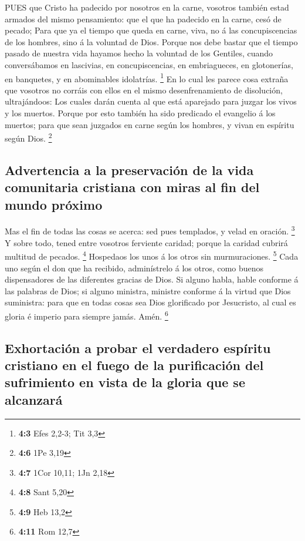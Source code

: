  PUES que Cristo ha padecido por nosotros en la carne,
vosotros también estad armados del mismo pensamiento: que el que ha
padecido en la carne, cesó de pecado;  Para que ya el tiempo
que queda en carne, viva, no á las concupiscencias de los hombres, sino
á la voluntad de Dios.  Porque nos debe bastar que el tiempo
pasado de nuestra vida hayamos hecho la voluntad de los Gentiles, cuando
conversábamos en lascivias, en concupiscencias, en embriagueces, en
glotonerías, en banquetes, y en abominables idolatrías. \footnote{\textbf{4:3}
  Efes 2,2-3; Tit 3,3}  En lo cual les parece cosa extraña
que vosotros no corráis con ellos en el mismo desenfrenamiento de
disolución, ultrajándoos:  Los cuales darán cuenta al que
está aparejado para juzgar los vivos y los muertos.  Porque
por esto también ha sido predicado el evangelio á los muertos; para que
sean juzgados en carne según los hombres, y vivan en espíritu según
Dios. \footnote{\textbf{4:6} 1Pe 3,19}

\hypertarget{advertencia-a-la-preservaciuxf3n-de-la-vida-comunitaria-cristiana-con-miras-al-fin-del-mundo-pruxf3ximo}{%
\subsection{Advertencia a la preservación de la vida comunitaria
cristiana con miras al fin del mundo
próximo}\label{advertencia-a-la-preservaciuxf3n-de-la-vida-comunitaria-cristiana-con-miras-al-fin-del-mundo-pruxf3ximo}}

 Mas el fin de todas las cosas se acerca: sed pues
templados, y velad en oración. \footnote{\textbf{4:7} 1Cor 10,11; 1Jn
  2,18}  Y sobre todo, tened entre vosotros ferviente
caridad; porque la caridad cubrirá multitud de pecados. \footnote{\textbf{4:8}
  Sant 5,20}  Hospedaos los unos á los otros sin
murmuraciones. \footnote{\textbf{4:9} Heb 13,2}  Cada uno
según el don que ha recibido, adminístrelo á los otros, como buenos
dispensadores de las diferentes gracias de Dios.  Si alguno
habla, hable conforme á las palabras de Dios; si alguno ministra,
ministre conforme á la virtud que Dios suministra: para que en todas
cosas sea Dios glorificado por Jesucristo, al cual es gloria é imperio
para siempre jamás. Amén. \footnote{\textbf{4:11} Rom 12,7}

\hypertarget{exhortaciuxf3n-a-probar-el-verdadero-espuxedritu-cristiano-en-el-fuego-de-la-purificaciuxf3n-del-sufrimiento-en-vista-de-la-gloria-que-se-alcanzaruxe1}{%
\subsection{Exhortación a probar el verdadero espíritu cristiano en el
fuego de la purificación del sufrimiento en vista de la gloria que se
alcanzará}\label{exhortaciuxf3n-a-probar-el-verdadero-espuxedritu-cristiano-en-el-fuego-de-la-purificaciuxf3n-del-sufrimiento-en-vista-de-la-gloria-que-se-alcanzaruxe1}}

